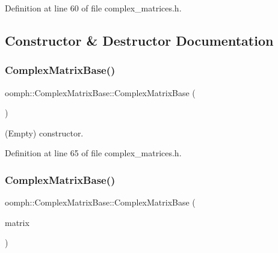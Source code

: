 Definition at line 60 of file complex\+\_\+matrices.\+h.



\subsection{Constructor \& Destructor Documentation}
\mbox{\label{classoomph_1_1ComplexMatrixBase_aecfeaf77e3e03743b0b87f677470c56d}} 
\subsubsection{\texorpdfstring{Complex\+Matrix\+Base()}{ComplexMatrixBase()}\hspace{0.1cm}{\footnotesize\ttfamily [1/2]}}
{\footnotesize\ttfamily oomph\+::\+Complex\+Matrix\+Base\+::\+Complex\+Matrix\+Base (\begin{DoxyParamCaption}{ }\end{DoxyParamCaption})\hspace{0.3cm}{\ttfamily [inline]}}



(Empty) constructor. 



Definition at line 65 of file complex\+\_\+matrices.\+h.

\mbox{\label{classoomph_1_1ComplexMatrixBase_a000722ba16915a4b9770238997b43d19}} 
\subsubsection{\texorpdfstring{Complex\+Matrix\+Base()}{ComplexMatrixBase()}\hspace{0.1cm}{\footnotesize\ttfamily [2/2]}}
{\footnotesize\ttfamily oomph\+::\+Complex\+Matrix\+Base\+::\+Complex\+Matrix\+Base (\begin{DoxyParamCaption}\item[{const \hyperlink{classoomph_1_1ComplexMatrixBase}{Complex\+Matrix\+Base} \&}]{matrix }\end{DoxyParamCaption})\hspace{0.3cm}{\ttfamily [inline]}}



